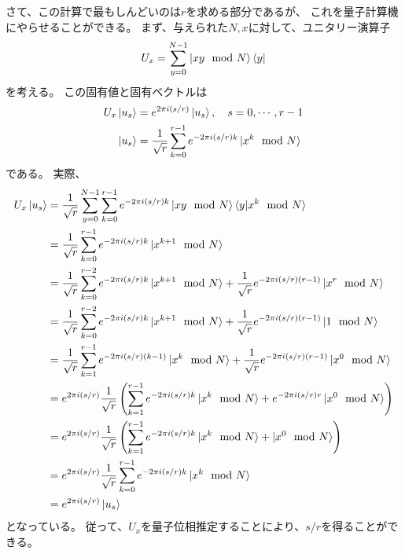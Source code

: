 \documentclass[]{ltjsarticle}
\begin{document}
さて、この計算で最もしんどいのは$r$を求める部分であるが、
これを量子計算機にやらせることができる。
まず、与えられた$N,x$に対して、ユニタリー演算子
\begin{align}
    U_x = \sum_{y=0}^{N-1} \ket{xy \mod N}\bra{y}
\end{align}
を考える。
この固有値と固有ベクトルは
\begin{align}
    U_x \ket{u_s} 
    &= 
    e^{2\pi i (s/r)} \ket{u_s}, \quad 
    s = 0, \cdots, r-1 \\
    \ket{u_s} 
    &=
    \frac{1}{\sqrt{r}}
    \sum_{k=0}^{r-1}
    e^{-2\pi i (s/r) k}
    \ket{x^k \mod N}
\end{align}
である。
実際、
\begin{align}
    U_x \ket{u_s}
    &=
    \frac{1}{\sqrt{r}}
    \sum_{y=0}^{N-1} 
    \sum_{k=0}^{r-1}
    e^{-2\pi i (s/r) k}
    \ket{xy \mod N}\braket{y|x^k \mod N} \\
    &=
    \frac{1}{\sqrt{r}}
    \sum_{k=0}^{r-1}
    e^{-2\pi i (s/r) k}
    \ket{x^{k+1} \mod N} \\
    &=
    \frac{1}{\sqrt{r}}
    \sum_{k=0}^{r-2}
    e^{-2\pi i (s/r) k}
    \ket{x^{k+1} \mod N}
    +
    \frac{1}{\sqrt{r}}
    e^{-2\pi i (s/r) (r-1)}
    \ket{x^{r} \mod N} \\
    &=
    \frac{1}{\sqrt{r}}
    \sum_{k=0}^{r-2}
    e^{-2\pi i (s/r) k}
    \ket{x^{k+1} \mod N}
    +
    \frac{1}{\sqrt{r}}
    e^{-2\pi i (s/r) (r-1)}
    \ket{1 \mod N} \\
    &=
    \frac{1}{\sqrt{r}}
    \sum_{k=1}^{r-1}
    e^{-2\pi i (s/r) (k-1)}
    \ket{x^{k} \mod N}
    +
    \frac{1}{\sqrt{r}}
    e^{-2\pi i (s/r) (r-1)}
    \ket{x^0 \mod N} \\
    &=
    e^{2\pi i (s/r)}
    \frac{1}{\sqrt{r}}
    \left(
        \sum_{k=1}^{r-1}
        e^{-2\pi i (s/r) k}
        \ket{x^{k} \mod N}
        +
        e^{-2\pi i (s/r) r}
        \ket{x^0 \mod N}    
    \right) \\
    &=
    e^{2\pi i (s/r)}
    \frac{1}{\sqrt{r}}
    \left(
        \sum_{k=1}^{r-1}
        e^{-2\pi i (s/r) k}
        \ket{x^{k} \mod N}
        +
        \ket{x^0 \mod N}    
    \right) \\
    &=
    e^{2\pi i (s/r)}
    \frac{1}{\sqrt{r}}
    \sum_{k=0}^{r-1}
    e^{-2\pi i (s/r) k}
    \ket{x^{k} \mod N} \\
    &=
    e^{2\pi i (s/r)}
    \ket{u_s}
\end{align}
となっている。
従って、$U_x$を量子位相推定することにより、$s/r$を得ることができる。
\end{document}
